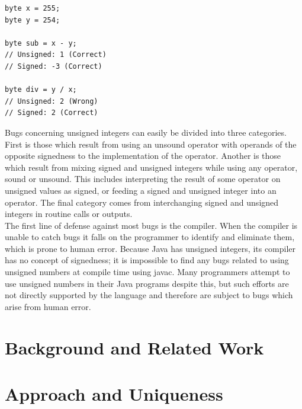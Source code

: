 \documentclass{sigplanconf}
\begin{document}

\begin{lstlisting}[caption=Example depicting subtraction\, a sound operator\, and division\, an unsound operator.]
byte x = 255;
byte y = 254;

byte sub = x - y;
// Unsigned: 1 (Correct)
// Signed: -3 (Correct)

byte div = y / x;
// Unsigned: 2 (Wrong)
// Signed: 2 (Correct)
\end{lstlisting}

\indent
Bugs concerning unsigned integers can easily be divided into three categories. First is those which result from using an unsound operator with operands of the opposite signedness to the implementation of the operator. Another is those which result from mixing signed and unsigned integers while using any operator, sound or unsound. This includes interpreting the result of some operator on unsigned values as signed, or feeding a signed and unsigned integer into an operator. The final category comes from interchanging signed and unsigned integers in routine calls or outputs.\\
\indent
The first line of defense against most bugs is the compiler. When the compiler is unable to catch bugs it falls on the programmer to identify and eliminate them, which is prone to human error. Because Java has unsigned integers, its compiler has no concept of signedness; it is impossible to find any bugs related to using unsigned numbers at compile time using javac. Many programmers attempt to use unsigned numbers in their Java programs despite this, but such efforts are not directly supported by the language and therefore are subject to bugs which arise from human error.\\

\section{Background and Related Work}


\section{Approach and Uniqueness}
\end{document}
